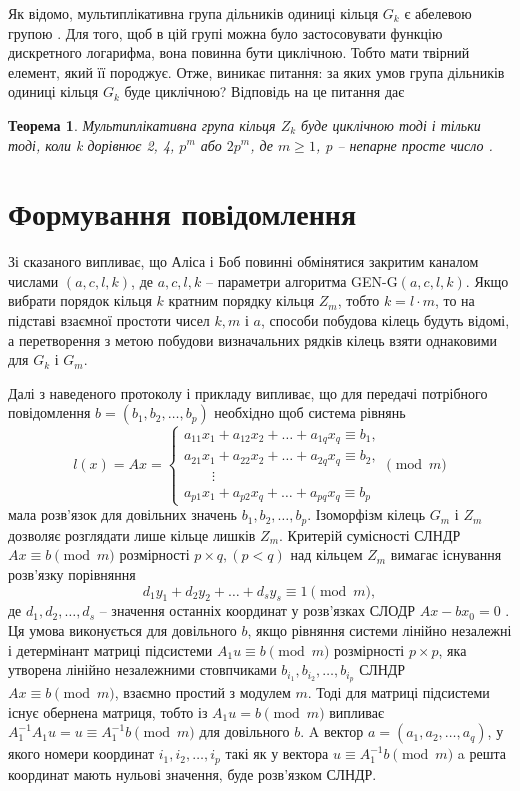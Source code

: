 \documentclass{ceurart}
\newtheorem{theorem}{Теорема}
\begin{document}
Як відомо, мультиплікативна група дільників одиниці кільця \(G_k\) є абелевою
групою \cite{6}. Для того, щоб в цій групі можна було застосовувати функцію
дискретного логарифма, вона повинна бути циклічною. Тобто мати твірний
елемент, який її породжує. Отже, виникає питання: за яких умов група
дільників одиниці кільця \(G_k\) буде циклічною? Відповідь на це питання дає
\begin{theorem}\label{gaus} %
Мультиплікативна група кільця \(Z_k\) буде циклічною тоді і тільки
тоді, коли k дорівнює 2, 4, \(p^m\) або \(2p^m\), де \(m\geq 1\), p --
непарне просте число \cite{6}.
\end{theorem}


\section{Формування повідомлення}
Зі сказаного випливає, що Аліса і Боб повинні обмінятися
закритим каналом числами \((a,c,l,k)\), де \(a,c,l,k\) -- параметри
алгоритма GEN-G\((a,c,l,k)\). Якщо вибрати порядок кільця \(k\) кратним
порядку кільця \(Z_m\), тобто \(k=l\cdot m\), то на підставі взаємної
простоти чисел \(k,m\) і \(a\), способи побудова кілець будуть відомі,
а перетворення з метою побудови визначальних рядків кілець взяти
однаковими для \(G_k\) і \(G_m\).

Далі з наведеного протоколу і прикладу випливає, що для передачі
потрібного повідомлення \(b=(b_1,b_2,\ldots,b_p)\) необхідно щоб
система рівнянь
\begin{equation}\label{eq4} %
l(x)=Ax= \begin{cases}
  a_{11}x_1+ a_{12}x_2 +\ldots + a_{1q}x_q \equiv b_1, \\
  a_{21}x_1+ a_{22}x_2 +\ldots + a_{2q}x_q \equiv b_2, \\
  \qquad \vdots \\
  a_{p1}x_1+ a_{p2}x_q +\ldots + a_{pq}x_q \equiv b_p
\end{cases} \pmod{m}
\end{equation}
мала розв'язок для довільних значень \(b_1,b_2,\ldots,b_p\).
Ізоморфізм кілець \(G_m\) і \(Z_m\) дозволяє розглядати лише кільце
лишків \(Z_m\). Критерій сумісності СЛНДР \(Ax\equiv b \pmod{m}\) розмірності
\(p\times q, (p < q)\) над кільцем \(Z_m\) вимагає існування розв'язку порівняння
   \[d_1y_1+d_2y_2+\ldots +d_sy_s\equiv 1 \pmod{m},\]
де \(d_1,d_2,\ldots,d_s\) -- значення останніх координат у розв'язках СЛОДР
\(Ax-bx_0=0\) \cite{7}. Ця умова виконується для довільного \(b\), якщо
рівняння системи лінійно незалежні і детермінант матриці підсистеми
\(A_1u\equiv b \pmod{m}\) розмірності \(p\times p\), яка утворена лінійно
незалежними стовпчиками \(b_{i_1},b_{i_2},\ldots,b_{i_p}\) СЛНДР \(Ax\equiv
b \pmod{m}\), взаємно простий з модулем \(m\). Тоді для матриці
підсистеми існує обернена матриця, тобто із \(A_1u=b \pmod{m}\) випливає
\(A^{-1}_1A_1u=u\equiv A_1^{-1}b \pmod{m}\) для довільного \(b\). A вектор
\(a=(a_1,a_2,\ldots,a_q)\), у якого номери координат \(i_1,i_2,\ldots,i_p\)
такі як у вектора \(u\equiv A_1^{-1}b \pmod{m}\) a решта координат мають
нульові значення, буде розв'язком СЛНДР.
\end{document}
